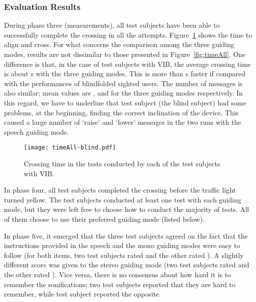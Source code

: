 \documentclass{article}
\begin{document}
\subsubsection{Evaluation Results}
During phase three (measurements), all test subjects have been able to successfully complete the crossing in all the attempts.
Figure~\ref{fig:timeAll-blind} shows the time to align and cross. 
For what concerns the comparison among the three guiding modes, results are not dissimilar to those presented in Figure~\ref{fig:timeAll}.
One difference is that, in the case of test subjects with VIB, the average crossing time is about s with the three guiding modes. This is more than s faster if compared with the performances of blindfolded sighted users.
The number of messages is also similar; mean values are ,  and  for the three guiding modes respectively. In this regard, we have to underline that test subject  (the blind subject) had some problems, at the beginning, finding the correct inclination of the device. This caused a large number of `raise' and `lower' messages in the two runs with the speech guiding mode.

\begin{figure}[t!]
	\centering
		\texttt{[image: timeAll-blind.pdf]}
	\caption[]{Crossing time in the  tests conducted by each of the  test subjects with VIB.}
	\label{fig:timeAll-blind}
\end{figure}

In phase four, all test subjects completed the crossing before the traffic light turned yellow. The test subjects conducted at least one test with each guiding mode, but they were left free to choose how to conduct the majority of tests. All of them choose to use their preferred guiding mode (listed below).

In phase five, it emerged that the three test subjects agreed on the fact that the instructions provided in the speech and the mono guiding modes were easy to follow (for both items, two test subjects rated  and the other rated ).
A slightly different score was given to the stereo guiding mode (two test subjects rated  and the other rated ).
Vice versa, there is no consensus about how hard it is to remember the sonifications; two test subjects reported that they are hard to remember, while test subject  reported the opposite.
\end{document}
